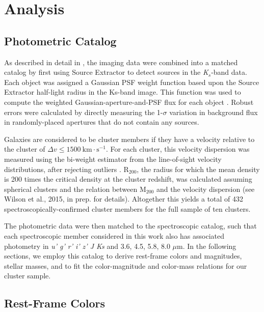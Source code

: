 \section{Analysis}\label{analysis}

\subsection{Photometric Catalog}\label{sec-catalog}

As described in detail in \citet{van-der-Burg:2013zn}, the imaging data were combined into a matched catalog by first using Source Extractor to detect sources in the \textit{K$_s$}-band data. Each object was assigned a Gaussian PSF weight function based upon the Source Extractor half-light radius in the Ks-band image. This function was used to compute the weighted Gaussian-aperture-and-PSF flux for each object \citep{Kuijken:2008vf}. Robust errors were calculated by directly measuring the 1-$\sigma$ variation in background flux in randomly-placed apertures that do not contain any sources.

Galaxies are considered to be cluster members if they have a velocity relative to the cluster of $\Delta v \le 1500~\mathrm{km\cdot s^{-1}}$. For each cluster, this velocity dispersion was measured using the bi-weight estimator \citep{Beers:1990bf}
from the line-of-sight velocity distributions, after rejecting outliers \citep{Girardi:1993ud,Fadda:1996kk}. R$_{200}$, the radius for which the mean density is 200 times the critical density at the cluster redshift, was calculated assuming spherical clusters and the \citet{Evrard:2008lr} relation between $\mathrm{M}_{200}$ and the velocity dispersion (see Wilson et al., 2015, in prep. for details). Altogether this yields a total of 432 spectroscopically-confirmed cluster members for the full sample of ten clusters.


The photometric data were then matched to the spectroscopic catalog, such that each spectroscopic member considered in this work also has associated photometry in \textit{u' g' r' i' z' J Ks } and 3.6, 4.5, 5.8, 8.0 $\mu$m. In the following sections, we employ this catalog to derive rest-frame colors and magnitudes, stellar masses, and to fit the color-magnitude and color-mass relations for our cluster sample.

\subsection{Rest-Frame Colors}\label{sec-rest_frame_color}

